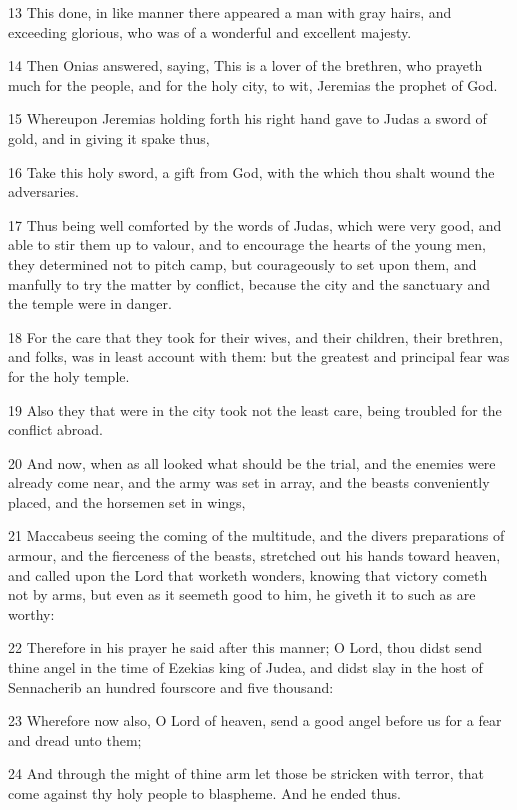 \par 13 This done, in like manner there appeared a man with gray hairs, and exceeding glorious, who was of a wonderful and excellent majesty.
\par 14 Then Onias answered, saying, This is a lover of the brethren, who prayeth much for the people, and for the holy city, to wit, Jeremias the prophet of God.
\par 15 Whereupon Jeremias holding forth his right hand gave to Judas a sword of gold, and in giving it spake thus,
\par 16 Take this holy sword, a gift from God, with the which thou shalt wound the adversaries.
\par 17 Thus being well comforted by the words of Judas, which were very good, and able to stir them up to valour, and to encourage the hearts of the young men, they determined not to pitch camp, but courageously to set upon them, and manfully to try the matter by conflict, because the city and the sanctuary and the temple were in danger.
\par 18 For the care that they took for their wives, and their children, their brethren, and folks, was in least account with them: but the greatest and principal fear was for the holy temple.
\par 19 Also they that were in the city took not the least care, being troubled for the conflict abroad.
\par 20 And now, when as all looked what should be the trial, and the enemies were already come near, and the army was set in array, and the beasts conveniently placed, and the horsemen set in wings,
\par 21 Maccabeus seeing the coming of the multitude, and the divers preparations of armour, and the fierceness of the beasts, stretched out his hands toward heaven, and called upon the Lord that worketh wonders, knowing that victory cometh not by arms, but even as it seemeth good to him, he giveth it to such as are worthy:
\par 22 Therefore in his prayer he said after this manner; O Lord, thou didst send thine angel in the time of Ezekias king of Judea, and didst slay in the host of Sennacherib an hundred fourscore and five thousand:
\par 23 Wherefore now also, O Lord of heaven, send a good angel before us for a fear and dread unto them;
\par 24 And through the might of thine arm let those be stricken with terror, that come against thy holy people to blaspheme. And he ended thus.
